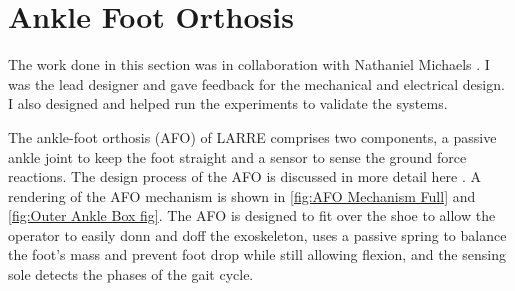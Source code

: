 
\section{Ankle Foot Orthosis}
\label{sec:ankle}
The work done in this section was in collaboration with Nathaniel Michaels \cite{michaels2020modular}. I was the lead designer and gave feedback for the mechanical and electrical design. I also designed and helped run the experiments to validate the systems. 

The ankle-foot orthosis (AFO) of LARRE comprises two components, a passive ankle joint to keep the foot straight and a sensor to sense the ground force reactions. The design process of the AFO is discussed in more detail here \cite{Michaels2020}. A rendering of the AFO mechanism is shown in \autoref{fig:AFO Mechanism Full} and \autoref{fig:Outer Ankle Box fig}. The AFO is designed to fit over the shoe to allow the operator to easily donn and doff the exoskeleton, uses a passive spring to balance the foot's mass and prevent foot drop while still allowing flexion, and the sensing sole detects the phases of the gait cycle. 


